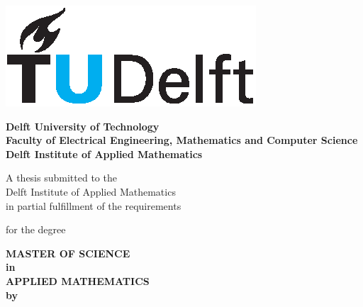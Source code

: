 \documentclass[a4paper,11pt]{book}
\theoremstyle{definition}
\begin{document}
\begin{titlepage}

\thispagestyle{empty}

{\hspace{10cm}
\begin{minipage}{5cm}
  \includegraphics{tudelft.eps}
\end{minipage}}

\begin{center}

\vspace{1.0cm}

\large
\textbf{\large{Delft University of Technology}} \\
\textbf{\large{Faculty of Electrical Engineering, Mathematics and Computer Science}} \\
\textbf{\large{Delft Institute of Applied Mathematics}}

\vspace{2.0cm}


\vspace{2.0cm}

\large A thesis submitted to the\\
Delft Institute of Applied Mathematics\\
in partial fulfillment of the requirements

\vspace{1.0cm}

for the degree\\

\vspace{1.0cm}

\textbf{\large{MASTER OF SCIENCE} \\
in \\
\large{APPLIED MATHEMATICS} \\
\vspace{1cm}
by}


\end{center}
\end{titlepage}
\end{document}
